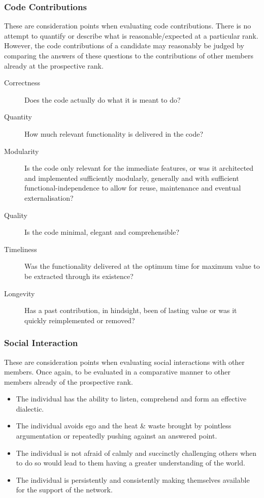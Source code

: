 \documentclass[9pt,oneside]{amsart}
\begin{document}
\subsubsection{Code Contributions}

These are consideration points when evaluating code contributions. There is no attempt to quantify or describe what is reasonable/expected at a particular rank. However, the code contributions of a candidate may reasonably be judged by comparing the answers of these questions to the contributions of other members already at the prospective rank.

\begin{description}
  \item[Correctness] Does the code actually do what it is meant to do?
  \item[Quantity] How much relevant functionality is delivered in the code?
  \item[Modularity] Is the code only relevant for the immediate features, or was it architected and implemented sufficiently modularly, generally and with sufficient functional-independence to allow for reuse, maintenance and eventual externalisation?
  \item[Quality] Is the code minimal, elegant and comprehensible?
  \item[Timeliness] Was the functionality delivered at the optimum time for maximum value to be extracted through its existence?
  \item[Longevity] Has a past contribution, in hindsight, been of lasting value or was it quickly reimplemented or removed?
\end{description}

\subsubsection{Social Interaction}

These are consideration points when evaluating social interactions with other members. Once again, to be evaluated in a comparative manner to other members already of the prospective rank.

\begin{itemize}
  \item The individual has the ability to listen, comprehend and form an effective dialectic.
  \item The individual avoids ego and the heat \& waste brought by pointless argumentation or repeatedly pushing against an answered point.
  \item The individual is not afraid of calmly and succinctly challenging others when to do so would lead to them having a greater understanding of the world.
  \item The individual is persistently and consistently making themselves available for the support of the network.
\end{itemize}
\end{document}
